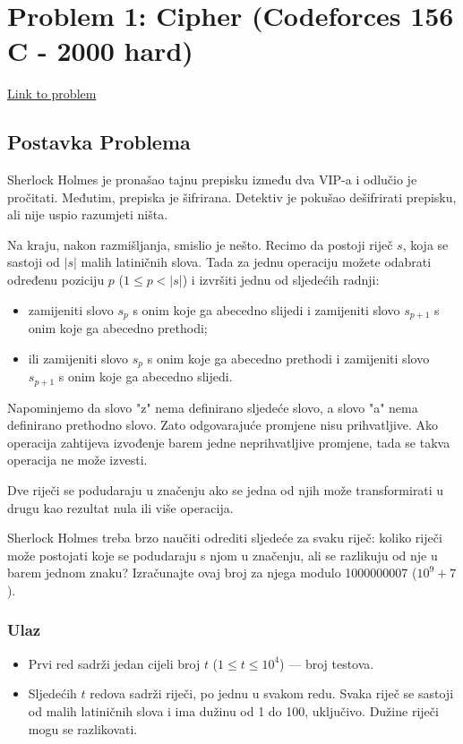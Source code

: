 \section{Problem 1: Cipher (Codeforces 156 C - 2000 hard)}
\href{https://codeforces.com/contest/156/problem/C}{Link to problem}

\subsection{Postavka Problema}
Sherlock Holmes je pronašao tajnu prepisku između dva VIP-a i odlučio je pročitati. Međutim, prepiska je šifrirana. Detektiv je pokušao dešifrirati prepisku, ali nije uspio razumjeti ništa.

Na kraju, nakon razmišljanja, smislio je nešto. Recimo da postoji riječ $s$, koja se sastoji od $|s|$ malih latiničnih slova. Tada za jednu operaciju možete odabrati određenu poziciju $p$ ($1 \leq p < |s|$) i izvršiti jednu od sljedećih radnji:

\begin{itemize}
    \item zamijeniti slovo $s_p$ s onim koje ga abecedno slijedi i zamijeniti slovo $s_{p+1}$ s onim koje ga abecedno prethodi;
    \item ili zamijeniti slovo $s_p$ s onim koje ga abecedno prethodi i zamijeniti slovo $s_{p+1}$ s onim koje ga abecedno slijedi.
\end{itemize}

Napominjemo da slovo "z" nema definirano sljedeće slovo, a slovo "a" nema definirano prethodno slovo. Zato odgovarajuće promjene nisu prihvatljive. Ako operacija zahtijeva izvođenje barem jedne neprihvatljive promjene, tada se takva operacija ne može izvesti.

Dve riječi se podudaraju u značenju ako se jedna od njih može transformirati u drugu kao rezultat nula ili više operacija.

Sherlock Holmes treba brzo naučiti odrediti sljedeće za svaku riječ: koliko riječi može postojati koje se podudaraju s njom u značenju, ali se razlikuju od nje u barem jednom znaku? Izračunajte ovaj broj za njega modulo 1000000007 ($10^9 + 7$).

\subsubsection{Ulaz}
\begin{itemize}
    \item Prvi red sadrži jedan cijeli broj $t$ ($1 \leq t \leq 10^4$) — broj testova.
    \item Sljedećih $t$ redova sadrži riječi, po jednu u svakom redu. Svaka riječ se sastoji od malih latiničnih slova i ima dužinu od 1 do 100, uključivo. Dužine riječi mogu se razlikovati.
\end{itemize}

